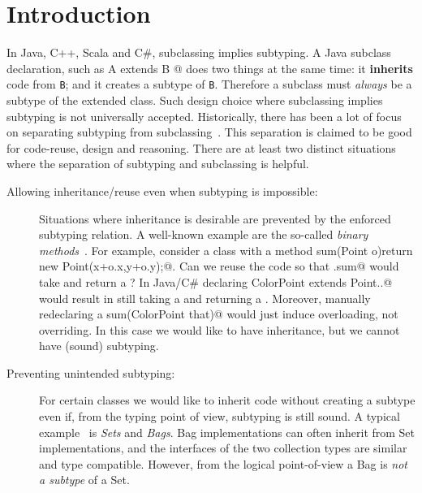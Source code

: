 
\section{Introduction}\label{sec:intro}

In Java, C++, Scala and C\#, subclassing 
implies subtyping. A Java subclass declaration, such as 
\Q@class A extends B {}@
\noindent does two things at the same time:
it \textbf{inherits} code from \lstinline{B}; and it creates
a subtype of \lstinline{B}. Therefore a subclass must \emph{always} be
a subtype of the extended class.
Such design choice where subclassing implies subtyping is not
universally accepted.
Historically, there has been a lot of focus on
separating subtyping from subclassing~\cite{cook}.  This separation is claimed to be
good for code-reuse, design and reasoning. There are at
least two distinct situations where the separation of subtyping and 
subclassing is helpful.

\begin{description}

\item[Allowing inheritance/reuse even when subtyping is impossible:] 
Situations where inheritance is desirable are prevented
by the enforced subtyping relation. A well-known example are the so-called \emph{binary methods}~\cite{cook,bruce96binary}.
For example, consider a class \Q@Point@ with a method 
\Q@Point sum(Point o){return new Point(x+o.x,y+o.y);}@.
Can we reuse the \Q@Point@ code so that \Q@ColorPoint.sum@
would take and return a \Q@ColorPoint@?
In Java/C\# declaring \Q@class ColorPoint extends Point{..}@ would result
in \Q@sum@ still taking a \Q@Point@ and returning a \Q@Point@.
Moreover, manually redeclaring a \Q@ColorPoint sum(ColorPoint that)@
would just induce overloading, not overriding.
In this case we would like to have inheritance, but we cannot
have (sound) subtyping.
%

\item[Preventing unintended subtyping:] For certain classes we
  would like to inherit code without creating a subtype even if, from
  the typing point of view, subtyping is still sound. A typical
  example~\cite{LaLonde:1991:SSS:110673.110679} is \emph{Sets} and
  \emph{Bags}. Bag implementations can often inherit 
  from Set implementations, and the interfaces of the two collection types are
  similar and type compatible. 
  However, from the logical point-of-view a Bag is \emph{not a
    subtype} of a Set. 

\end{description}


